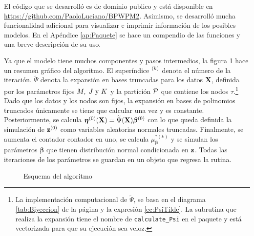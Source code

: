 \documentclass[../Main/Main.tex]{subfiles}
\begin{document}
El código que se desarrolló es de dominio publico y está disponible en \url{https://github.com/PaoloLuciano/BPWPM2}. Asimismo, se desarrolló mucha funcionalidad adicional para visualizar e imprimir información de los posibles modelos. En el Apéndice \ref{ap:Paquete} se hace un compendio de las funciones y una breve descripción de su uso. 

Ya que el modelo tiene muchos componentes y pasos intermedios, la figura \ref{fig:DiagramaAlgoritmo} hace un resumen gráfico del algoritmo. El superíndice $\iter{k}$ denota el número de la iteración. $\widetilde{\Psi}$ denota la expansión en bases truncadas para los datos $\xmat$,  definida por los parámetros fijos $\MJK$ y la partición $\P$ que contiene los nodos $\tau$.\footnote{La implementación computacional de $\widetilde{\Psi}$, se basa en el diagrama \ref{tab:Biyeccion} de la página \pageref{tab:Biyeccion} y la expresión \eqref{ec:PsiTilde}. La subrutina que realiza la expansión tiene el nombre de \texttt{calculate\_Psi} en el paquete y está vectorizada para que su ejecución sea veloz.} Dado que los datos y los nodos son fijos, la expansión en bases de polinomios truncados únicamente se tiene que calcular una vez y es constante. Posteriormente, se calcula $\bm{\eta}\iter{0}(\xmat) = \widetilde{\Psi}(\xmat)\bm{\beta}\iter{0}$ con lo que queda definida la simulación de $\zsn\iter{0}$ como variables aleatorias normales truncadas. Finalmente, se aumenta el contador contador en uno, se calcula $\mu_{\bm{\beta}}^{*(k)}$ y se simulan los parámetros $\bm{\beta}$ que tienen distribución normal condicionada en $\zsn$. Todas las iteraciones de los parámetros se guardan en un objeto que regresa la rutina. 
\begin{figure}[h]
\centering
{}
\caption{Esquema del algoritmo}
\label{fig:DiagramaAlgoritmo}
\end{figure}
\end{document}
